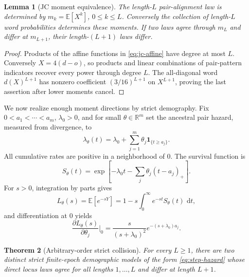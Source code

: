 \documentclass[11pt]{article}
\newtheorem{theorem}{Theorem}[section]
\newtheorem{lemma}[theorem]{Lemma}
\newcommand{\R}{\mathbb R}
\newcommand{\dd}{\,\mathrm d}
\begin{document}
\begin{lemma}[JC moment equivalence]
\label{lem:jc-moments}
The length-$L$ pair-alignment law is determined by $m_k=\mathbb E[X^k]$, $0\le k\le L$.  Conversely the collection of length-$L$ word probabilities determines these moments.  If two laws agree through $m_L$ and differ at $m_{L+1}$, their length-$(L+1)$ laws differ.
\end{lemma}

\begin{proof}
Products of the affine functions in \eqref{eq:jc-affine} have degree at most $L$.  Conversely $X=4(d-o)$, so products and linear combinations of pair-pattern indicators recover every power through degree $L$.  The all-diagonal word $d(X)^{L+1}$ has nonzero coefficient $(3/16)^{L+1}$ on $X^{L+1}$, proving the last assertion after lower moments cancel.
\end{proof}

We now realize enough moment directions by strict demography.  Fix $0<a_1<\cdots<a_m$, $\lambda_0>0$, and for small $\theta\in\R^m$ set the ancestral pair hazard, measured from divergence, to
\begin{equation}
\lambda_\theta(t)=\lambda_0+\sum_{j=1}^m\theta_j\mathbf 1_{\{t\ge a_j\}}.
\label{eq:step-hazard}
\end{equation}
All cumulative rates are positive in a neighborhood of $0$.  The survival function is
\[
S_\theta(t)=\exp\!\left[-\lambda_0t-\sum_j\theta_j(t-a_j)_+\right].
\]
For $s>0$, integration by parts gives
\[
L_\theta(s)=\mathbb E[e^{-sY}]=1-s\int_0^\infty e^{-st}S_\theta(t)\,\dd t,
\]
and differentiation at $0$ yields
\begin{equation}
\frac{\partial L_\theta(s)}{\partial\theta_j}\bigg|_{0}
=\frac{s}{(s+\lambda_0)^2}e^{-(s+\lambda_0)a_j}.
\label{eq:laplace-jac}
\end{equation}

\begin{theorem}[Arbitrary-order strict collision]
\label{thm:collision}
For every $L\ge1$, there are two distinct strict finite-epoch demographic models of the form \eqref{eq:step-hazard} whose direct locus laws agree for all lengths $1,\ldots,L$ and differ at length $L+1$.
\end{theorem}
\end{document}
